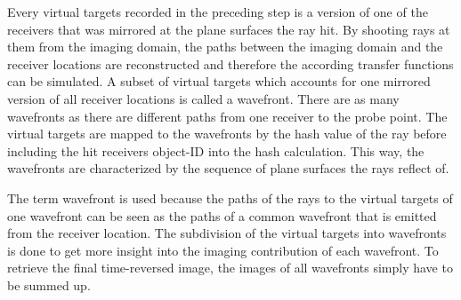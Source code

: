Every virtual targets recorded in the preceding step is a version of one of the receivers that was mirrored at the plane surfaces the ray hit.
By shooting rays at them from the imaging domain, the paths between the imaging domain and the receiver locations are reconstructed and therefore the according transfer functions can be simulated.
A subset of virtual targets which accounts for one mirrored version of all receiver locations is called a wavefront.
There are as many wavefronts as there are different paths from one receiver to the probe point.
The virtual targets are mapped to the wavefronts by the hash value of the ray before including the hit receivers object-ID into the hash calculation.
This way, the wavefronts are characterized by the sequence of plane surfaces the rays reflect of.

The term wavefront is used because the paths of the rays to the virtual targets of one wavefront can be seen as the paths of a common wavefront that is emitted from the receiver location.
The subdivision of the virtual targets into wavefronts is done to get more insight into the imaging contribution of each wavefront.
To retrieve the final time-reversed image, the images of all wavefronts simply have to be summed up.
